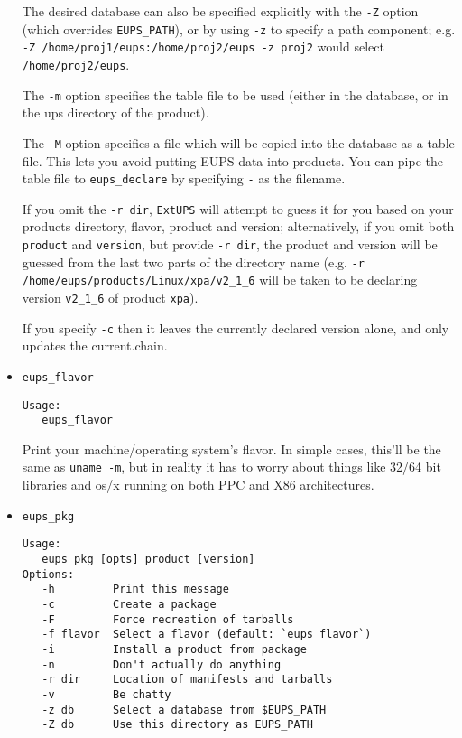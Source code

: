 \documentclass{article}
\newcommand{\code}[1]{\texttt{#1}}
\newcommand{\eups}{\code{ExtUPS}}
\begin{document}
\begin{itemize}
The desired database can also be specified
explicitly with the \code{-Z} option (which overrides \code{EUPS\_PATH}), or by using \code{-z}
to specify a path component; e.g.
\code{-Z /home/proj1/eups:/home/proj2/eups -z proj2} would select \code{/home/proj2/eups}.

The \code{-m} option specifies the table
file to be used (either in the database, or in the ups directory of the product).

The \code{-M} option specifies a file which will be copied into the
database as a table file. This lets you avoid putting EUPS data
into products. You can pipe the table file to \code{eups\_declare} by
specifying \code{-} as the filename.

If you omit the \code{-r dir}, \eups{} will attempt to guess it for you based
on your products directory, flavor, product and version; alternatively,
if you omit both \code{product} and \code{version}, but provide \code{-r dir},
the product and version will be guessed from the last two parts of the directory
name (e.g. \code{-r /home/eups/products/Linux/xpa/v2\_1\_6} will be taken to be
declaring version \code{v2\_1\_6} of product \code{xpa}).

If you specify \code{-c} then it leaves the currently declared version alone, and
only updates the current.chain.


  \item \code{eups\_flavor}
\begin{verbatim}
Usage:
   eups_flavor
\end{verbatim}
  
Print your machine/operating system's flavor.  In simple cases, this'll
be the same as \code{uname -m}, but in reality it has to worry about things
like 32/64 bit libraries and os/x running on both PPC and X86 architectures.

  

  \item \code{eups\_pkg}
\begin{verbatim}
Usage:
   eups_pkg [opts] product [version]
Options:
   -h         Print this message
   -c         Create a package
   -F         Force recreation of tarballs
   -f flavor  Select a flavor (default: `eups_flavor`)
   -i         Install a product from package
   -n         Don't actually do anything
   -r dir     Location of manifests and tarballs
   -v         Be chatty
   -z db      Select a database from $EUPS_PATH
   -Z db      Use this directory as EUPS_PATH
\end{verbatim}


\end{itemize}
\end{document}
